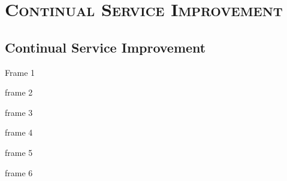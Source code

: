 \documentclass[xcolor=x11names,compress]{beamer}
\renewcommand{\(}{\begin{columns}}
\renewcommand{\)}{\end{columns}}
\newcommand{\<}[1]{\begin{column}{#1}}
\renewcommand{\>}{\end{column}}
\begin{document}
\section{\scshape Continual Service Improvement}
\subsection{Continual Service Improvement}
\begin{frame}{Frame 1}

\end{frame}
\begin{frame}{frame 2}

\end{frame}
\begin{frame}{frame 3}

\end{frame}
\begin{frame}{frame 4}

\end{frame}
\begin{frame}{frame 5}

\end{frame}
\begin{frame}{frame 6}

\end{frame}
\end{document}
